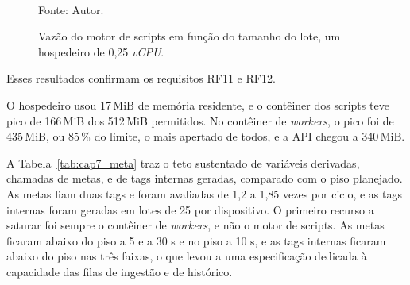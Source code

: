 \begin{figure}[H]
    \centering
    \caption{Vazão do motor de scripts em função do tamanho do lote, um hospedeiro de 0,25 \emph{vCPU}.}
    \label{fig:cap7_lote}
    \vspace{0.4cm}
    \vspace{0.2cm} \\
    Fonte: Autor.
\end{figure}

\par Esses resultados confirmam os requisitos RF11 e RF12.

\par O hospedeiro usou 17\,MiB de memória residente, e o contêiner dos scripts teve pico de 166\,MiB dos 512\,MiB permitidos. No contêiner de \emph{workers}, o pico foi de 435\,MiB, ou 85\,\% do limite, o mais apertado de todos, e a API chegou a 340\,MiB.

\par A Tabela~\ref{tab:cap7_meta} traz o teto sustentado de variáveis derivadas, chamadas de metas, e de tags internas geradas, comparado com o piso planejado. As metas liam duas tags e foram avaliadas de 1,2 a 1,85 vezes por ciclo, e as tags internas foram geradas em lotes de 25 por dispositivo. O primeiro recurso a saturar foi sempre o contêiner de \emph{workers}, e não o motor de scripts. As metas ficaram abaixo do piso a 5 e a 30 s e no piso a 10 s, e as tags internas ficaram abaixo do piso nas três faixas, o que levou a uma especificação dedicada à capacidade das filas de ingestão e de histórico.

